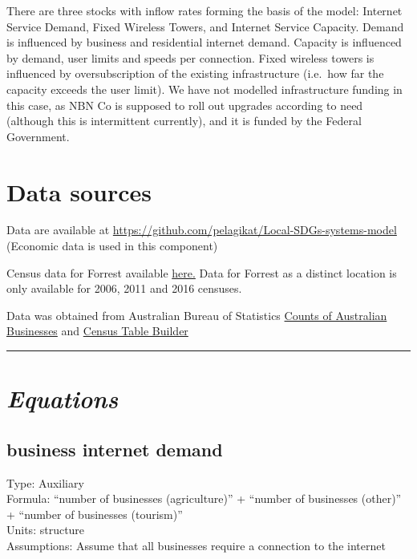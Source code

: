 \documentclass[
  11pt,
]{book}
\begin{document}
There are three stocks with inflow rates forming the basis of the model: Internet Service Demand, Fixed Wireless Towers, and Internet Service Capacity. Demand is influenced by business and residential internet demand. Capacity is influenced by demand, user limits and speeds per connection. Fixed wireless towers is influenced by oversubscription of the existing infrastructure (i.e.~how far the capacity exceeds the user limit). We have not modelled infrastructure funding in this case, as NBN Co is supposed to roll out upgrades according to need (although this is intermittent currently), and it is funded by the Federal Government.

\hypertarget{data-sources-7}{%
\section{Data sources}\label{data-sources-7}}

Data are available at \url{https://github.com/pelagikat/Local-SDGs-systems-model} (Economic data is used in this component)

Census data for Forrest available \href{https://www.abs.gov.au/websitedbs/D3310114.nsf/Home/2016\%20QuickStats}{here.} Data for Forrest as a distinct location is only available for 2006, 2011 and 2016 censuses.

Data was obtained from Australian Bureau of Statistics
\href{https://www.abs.gov.au/statistics/economy/business-indicators/counts-australian-businesses-including-entries-and-exits/latest-release}{Counts of Australian Businesses}
and \href{https://www.abs.gov.au/websitedbs/censushome.nsf/home/tablebuilder}{Census Table Builder}

\begin{center}\rule{0.5\linewidth}{0.5pt}\end{center}

\hypertarget{equations-9}{%
\section{\texorpdfstring{\emph{Equations}}{Equations}}\label{equations-9}}

\hypertarget{business-internet-demand}{%
\subsection{business internet demand}\label{business-internet-demand}}

Type: Auxiliary\\
Formula: ``number of businesses (agriculture)'' + ``number of businesses (other)'' + ``number of businesses (tourism)''\\
Units: structure\\
Assumptions: Assume that all businesses require a connection to the internet
\end{document}

